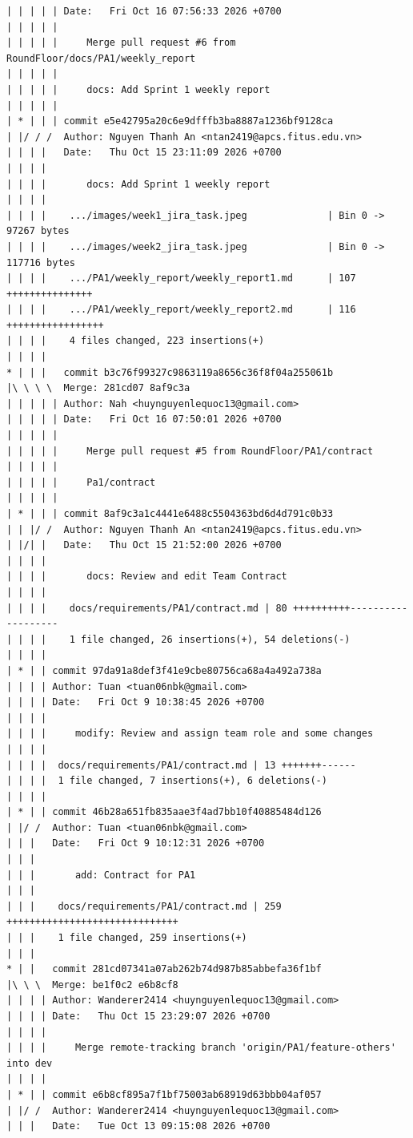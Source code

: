 \documentclass[12pt]{article}
\begin{document}
\begin{lstlisting}[numbers=none,breaklines=true]
| | | | | Date:   Fri Oct 16 07:56:33 2026 +0700
| | | | |
| | | | |     Merge pull request #6 from RoundFloor/docs/PA1/weekly_report
| | | | |
| | | | |     docs: Add Sprint 1 weekly report
| | | | |
| * | | | commit e5e42795a20c6e9dfffb3ba8887a1236bf9128ca
| |/ / /  Author: Nguyen Thanh An <ntan2419@apcs.fitus.edu.vn>
| | | |   Date:   Thu Oct 15 23:11:09 2026 +0700
| | | |
| | | |       docs: Add Sprint 1 weekly report
| | | |
| | | |    .../images/week1_jira_task.jpeg              | Bin 0 -> 97267 bytes
| | | |    .../images/week2_jira_task.jpeg              | Bin 0 -> 117716 bytes
| | | |    .../PA1/weekly_report/weekly_report1.md      | 107 +++++++++++++++
| | | |    .../PA1/weekly_report/weekly_report2.md      | 116 +++++++++++++++++
| | | |    4 files changed, 223 insertions(+)
| | | |
* | | |   commit b3c76f99327c9863119a8656c36f8f04a255061b
|\ \ \ \  Merge: 281cd07 8af9c3a
| | | | | Author: Nah <huynguyenlequoc13@gmail.com>
| | | | | Date:   Fri Oct 16 07:50:01 2026 +0700
| | | | |
| | | | |     Merge pull request #5 from RoundFloor/PA1/contract
| | | | |
| | | | |     Pa1/contract
| | | | |
| * | | | commit 8af9c3a1c4441e6488c5504363bd6d4d791c0b33
| | |/ /  Author: Nguyen Thanh An <ntan2419@apcs.fitus.edu.vn>
| |/| |   Date:   Thu Oct 15 21:52:00 2026 +0700
| | | |
| | | |       docs: Review and edit Team Contract
| | | |
| | | |    docs/requirements/PA1/contract.md | 80 ++++++++++-------------------
| | | |    1 file changed, 26 insertions(+), 54 deletions(-)
| | | |
| * | | commit 97da91a8def3f41e9cbe80756ca68a4a492a738a
| | | | Author: Tuan <tuan06nbk@gmail.com>
| | | | Date:   Fri Oct 9 10:38:45 2026 +0700
| | | |
| | | |     modify: Review and assign team role and some changes
| | | |
| | | |  docs/requirements/PA1/contract.md | 13 +++++++------
| | | |  1 file changed, 7 insertions(+), 6 deletions(-)
| | | |
| * | | commit 46b28a651fb835aae3f4ad7bb10f40885484d126
| |/ /  Author: Tuan <tuan06nbk@gmail.com>
| | |   Date:   Fri Oct 9 10:12:31 2026 +0700
| | |
| | |       add: Contract for PA1
| | |
| | |    docs/requirements/PA1/contract.md | 259 ++++++++++++++++++++++++++++++
| | |    1 file changed, 259 insertions(+)
| | |
* | |   commit 281cd07341a07ab262b74d987b85abbefa36f1bf
|\ \ \  Merge: be1f0c2 e6b8cf8
| | | | Author: Wanderer2414 <huynguyenlequoc13@gmail.com>
| | | | Date:   Thu Oct 15 23:29:07 2026 +0700
| | | |
| | | |     Merge remote-tracking branch 'origin/PA1/feature-others' into dev
| | | |
| * | | commit e6b8cf895a7f1bf75003ab68919d63bbb04af057
| |/ /  Author: Wanderer2414 <huynguyenlequoc13@gmail.com>
| | |   Date:   Tue Oct 13 09:15:08 2026 +0700

\end{lstlisting}
\end{document}
